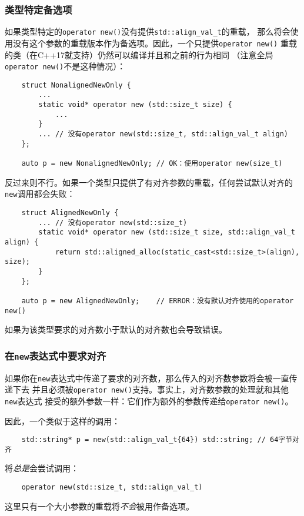 \subsubsection{类型特定备选项}\label{ch30.2.2.2}
如果类型特定的\texttt{operator new()}没有提供\texttt{std::align\_val\_t}的重载，
那么将会使用没有这个参数的重载版本作为备选项。因此，一个只提供\texttt{operator new()}
重载的类（在C++17就支持）仍然可以编译并且和之前的行为相同
（注意全局\texttt{operator new()}不是这种情况）：
\begin{lstlisting}
    struct NonalignedNewOnly {
        ...
        static void* operator new (std::size_t size) {
            ...
        }
        ... // 没有operator new(std::size_t, std::align_val_t align)
    };

    auto p = new NonalignedNewOnly; // OK：使用operator new(size_t)
\end{lstlisting}
反过来则不行。如果一个类型只提供了有对齐参数的重载，任何尝试默认对齐的\texttt{new}调用都会失败：
\begin{lstlisting}
    struct AlignedNewOnly {
        ... // 没有operator new(std::size_t)
        static void* operator new (std::size_t size, std::align_val_t align) {
            return std::aligned_alloc(static_cast<std::size_t>(align), size);
        }
    };

    auto p = new AlignedNewOnly;    // ERROR：没有默认对齐使用的operator new()
\end{lstlisting}
如果为该类型要求的对齐数小于默认的对齐数也会导致错误。

\subsubsection{在\texttt{new}表达式中要求对齐}
如果你在\texttt{new}表达式中传递了要求的对齐数，那么传入的对齐数参数将会被一直传递下去
并且必须被\texttt{operator new()}支持。事实上，对齐数参数的处理就和其他\texttt{new}表达式
接受的额外参数一样：它们作为额外的参数传递给\texttt{operator new()}。

因此，一个类似于这样的调用：
\begin{lstlisting}
    std::string* p = new(std::align_val_t{64}) std::string; // 64字节对齐
\end{lstlisting}
将\emph{总是}会尝试调用：
\begin{lstlisting}
    operator new(std::size_t, std::align_val_t)
\end{lstlisting}
这里只有一个大小参数的重载将\emph{不会}被用作备选项。

